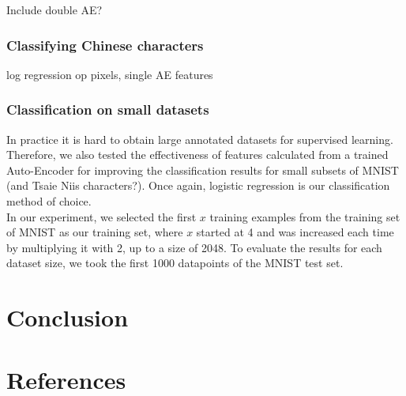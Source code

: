 \documentclass{article}
\begin{document}
Include double AE?

\subsubsection{Classifying Chinese characters}

log regression op pixels, single AE features

\subsubsection{Classification on small datasets}

In practice it is hard to obtain large annotated datasets for supervised learning. Therefore, we also tested the effectiveness of features calculated from a trained Auto-Encoder for improving the classification results for small subsets of MNIST (and Tsaie Niis characters?). Once again, logistic regression is our classification method of choice. \\ In our experiment, we selected the first $x$ training examples from the training set of MNIST as our training set, where $x$ started at 4 and was increased each time by multiplying it with 2, up to a size of 2048. To evaluate the results for each dataset size, we took the first 1000 datapoints of the MNIST test set.

\section*{Conclusion}



\pagebreak 
\section*{References}


\end{document}
